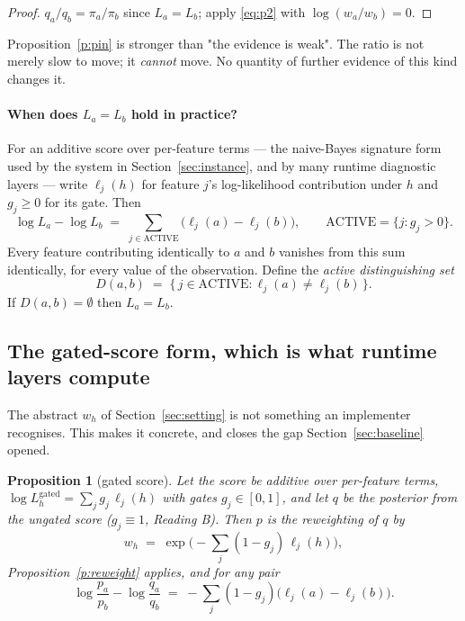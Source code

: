 \documentclass[11pt,a4paper]{article}
\newtheorem{proposition}{Proposition}
\theoremstyle{definition}
\begin{document}
\begin{proof}
$q_a/q_b=\pi_a/\pi_b$ since $L_a=L_b$; apply \eqref{eq:p2} with
$\log(w_a/w_b)=0$.
\end{proof}

Proposition~\ref{p:pin} is stronger than "the evidence is weak". The ratio is
not merely slow to move; it \emph{cannot} move. No quantity of further
evidence of this kind changes it.

\paragraph{When does $L_a=L_b$ hold in practice?} For an additive score over
per-feature terms --- the naive-Bayes signature form used by the system in
Section~\ref{sec:instance}, and by many runtime diagnostic layers --- write
$\ell_j(h)$ for feature $j$'s log-likelihood contribution under $h$ and
$g_j\ge 0$ for its gate. Then
\begin{equation}
\log L_a - \log L_b
\;=\;
\sum_{j \in \mathrm{ACTIVE}} \big(\ell_j(a) - \ell_j(b)\big),
\qquad
\mathrm{ACTIVE}=\{j: g_j>0\}.
\end{equation}
Every feature contributing identically to $a$ and $b$ vanishes from this sum
identically, for every value of the observation. Define the
\emph{active distinguishing set}
\begin{equation}
D(a,b) \;=\; \{\, j \in \mathrm{ACTIVE} : \ell_j(a) \neq \ell_j(b) \,\}.
\label{eq:D}
\end{equation}
If $D(a,b)=\emptyset$ then $L_a=L_b$.

\subsection{The gated-score form, which is what runtime layers compute}
\label{sec:gated}

The abstract $w_h$ of Section~\ref{sec:setting} is not something an
implementer recognises. This makes it concrete, and closes the gap
Section~\ref{sec:baseline} opened.

\begin{proposition}[gated score]\label{p:gated}
Let the score be additive over per-feature terms, $\log L_h^{\mathrm{gated}}
= \sum_j g_j\,\ell_j(h)$ with gates $g_j\in[0,1]$, and let $q$ be the
posterior from the ungated score ($g_j\equiv 1$, Reading B). Then $p$ is the
reweighting of $q$ by
\begin{equation}
w_h \;=\; \exp\!\Big(-\sum_j (1-g_j)\,\ell_j(h)\Big),
\label{eq:wgate}
\end{equation}
Proposition~\ref{p:reweight} applies, and for any pair
\begin{equation}
\log\frac{p_a}{p_b} - \log\frac{q_a}{q_b}
\;=\;
-\sum_j (1-g_j)\big(\ell_j(a)-\ell_j(b)\big).
\label{eq:withheld}
\end{equation}
\end{proposition}
\end{document}
